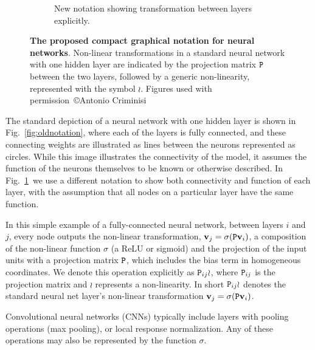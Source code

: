 \documentclass[thesis]{subfiles}
\begin{document}
\begin{figure}[htbp!]
\begin{subfigure}[b]{0.45\textwidth}
   \caption{New notation showing transformation between layers explicitly.}
   \label{fig:newnotation}
\end{subfigure}
\caption[New graphical notation for a standard neural network with one hidden layer.]{{\bf The proposed compact graphical notation for neural networks}. Non-linear transformations in a standard neural network with one hidden layer are indicated by the projection matrix $\mat P$ between the two layers, followed by a generic non-linearity, represented with the symbol $\wr$. Figures used with permission~\copyright Antonio Criminisi}
\label{fig:newGraphLanguage}
\end{figure}

The standard depiction of a neural network with one hidden layer is shown in Fig.~\ref{fig:oldnotation}, where each of the layers is fully connected, and these connecting weights are illustrated as lines between the neurons represented as circles. While this image illustrates the connectivity of the model, it assumes the function of the neurons themselves to be known or otherwise described. In Fig.~\ref{fig:newnotation}\ we use a different notation to show both connectivity and function of each layer, with the assumption that all nodes on a particular layer have the same function.

In this simple example of a fully-connected neural network, between layers $i$ and $j$, every node outputs the non-linear transformation, $\vec v_j = \sigma(\mat P \vec v_i)$, a composition of the non-linear function $\sigma$ (\eg a ReLU or sigmoid) and the projection of the input units with a projection matrix $\mat P$, which includes the bias term in homogeneous coordinates. We denote this operation explicitly as $\mat P_{ij} \wr$, where $\mat P_{ij}$ is the projection matrix and $\wr$ represents a non-linearity. In short $\mat P_{ij} \wr$ denotes the standard neural net layer's non-linear transformation $\vec v_j = \sigma(\mat P \vec v_i)$. 

Convolutional neural networks (CNNs) typically include layers with pooling operations (\eg max pooling), or local response normalization. Any of these operations may also be represented by the function $\sigma$.
\end{document}
